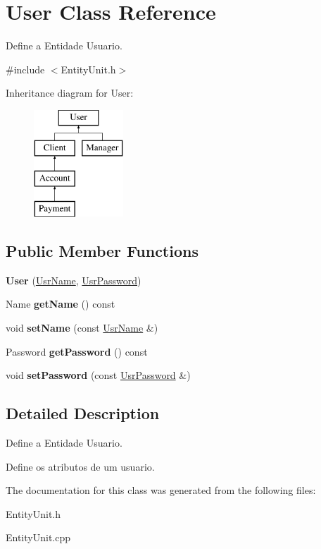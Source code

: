 \hypertarget{classUser}{\section{User Class Reference}
\label{classUser}
}


Define a Entidade Usuario.  




{\ttfamily \#include $<$Entity\-Unit.\-h$>$}

Inheritance diagram for User\-:\begin{figure}[H]
\begin{center}
\leavevmode
\includegraphics[height=4.000000cm]{classUser}
\end{center}
\end{figure}
\subsection*{Public Member Functions}
\begin{DoxyCompactItemize}
\item 
\hypertarget{classUser_a7880d8ba53dd3388510a2ebd886f02f4}{{\bfseries User} (\hyperlink{classUsrName}{Usr\-Name}, \hyperlink{classUsrPassword}{Usr\-Password})}\label{classUser_a7880d8ba53dd3388510a2ebd886f02f4}

\item 
\hypertarget{classUser_a207eca421d30023b3114d4fba6fa7fa0}{Name {\bfseries get\-Name} () const }\label{classUser_a207eca421d30023b3114d4fba6fa7fa0}

\item 
\hypertarget{classUser_a3a25b1b158ff07d1349d1d3019c7c0c0}{void {\bfseries set\-Name} (const \hyperlink{classUsrName}{Usr\-Name} \&)}\label{classUser_a3a25b1b158ff07d1349d1d3019c7c0c0}

\item 
\hypertarget{classUser_a7881ced623bfcfe9cda5deee5e461478}{Password {\bfseries get\-Password} () const }\label{classUser_a7881ced623bfcfe9cda5deee5e461478}

\item 
\hypertarget{classUser_a524865340fb55a6bdc983143cc82fd5d}{void {\bfseries set\-Password} (const \hyperlink{classUsrPassword}{Usr\-Password} \&)}\label{classUser_a524865340fb55a6bdc983143cc82fd5d}

\end{DoxyCompactItemize}


\subsection{Detailed Description}
Define a Entidade Usuario. 

Define os atributos de um usuario. 

The documentation for this class was generated from the following files\-:\begin{DoxyCompactItemize}
\item 
Entity\-Unit.\-h\item 
Entity\-Unit.\-cpp\end{DoxyCompactItemize}
